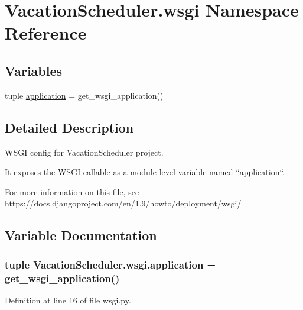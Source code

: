 \hypertarget{namespaceVacationScheduler_1_1wsgi}{\section{Vacation\-Scheduler.\-wsgi Namespace Reference}
\label{namespaceVacationScheduler_1_1wsgi}
}
\subsection*{Variables}
\begin{DoxyCompactItemize}
\item 
tuple \hyperlink{namespaceVacationScheduler_1_1wsgi_ae72c171b7add0dd119c41bf17421710c}{application} = get\-\_\-wsgi\-\_\-application()
\end{DoxyCompactItemize}


\subsection{Detailed Description}
\begin{DoxyVerb}WSGI config for VacationScheduler project.

It exposes the WSGI callable as a module-level variable named ``application``.

For more information on this file, see
https://docs.djangoproject.com/en/1.9/howto/deployment/wsgi/
\end{DoxyVerb}
 

\subsection{Variable Documentation}
\hypertarget{namespaceVacationScheduler_1_1wsgi_ae72c171b7add0dd119c41bf17421710c}{
\subsubsection[{application}]{\setlength{\rightskip}{0pt plus 5cm}tuple Vacation\-Scheduler.\-wsgi.\-application = get\-\_\-wsgi\-\_\-application()}}\label{namespaceVacationScheduler_1_1wsgi_ae72c171b7add0dd119c41bf17421710c}


Definition at line 16 of file wsgi.\-py.

